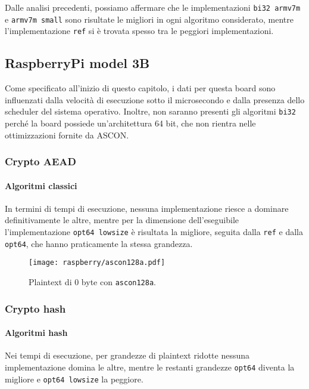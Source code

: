 Dalle analisi precedenti, possiamo affermare che le implementazioni \texttt{bi32 armv7m} e \texttt{armv7m small} sono risultate le migliori in ogni algoritmo considerato, mentre l'implementazione \texttt{ref} si è trovata spesso tra le peggiori implementazioni.

\subsection{RaspberryPi model 3B}

Come specificato all'inizio di questo capitolo, i dati per questa board sono influenzati dalla velocità di esecuzione sotto il microsecondo e dalla presenza dello scheduler del sistema operativo. Inoltre, non saranno presenti gli algoritmi \texttt{bi32} perché la board possiede un'architettura 64 bit, che non rientra nelle ottimizzazioni fornite da ASCON.

\subsubsection{Crypto AEAD}

\paragraph{Algoritmi classici}

In termini di tempi di esecuzione, nessuna implementazione riesce a dominare definitivamente le altre, mentre per la dimensione dell'eseguibile l'implementazione \texttt{opt64 lowsize} è risultata la migliore, seguita dalla \texttt{ref} e dalla \texttt{opt64}, che hanno praticamente la stessa grandezza.

\begin{figure}[H]
    \centering
    \texttt{[image: raspberry/ascon128a.pdf]}
    \caption{Plaintext di 0 byte con \texttt{ascon128a}.}
\end{figure}

\subsubsection{Crypto hash}

\paragraph{Algoritmi hash}

Nei tempi di esecuzione, per grandezze di plaintext ridotte nessuna implementazione domina le altre, mentre le restanti grandezze \texttt{opt64} diventa la migliore e \texttt{opt64 lowsize} la peggiore.

